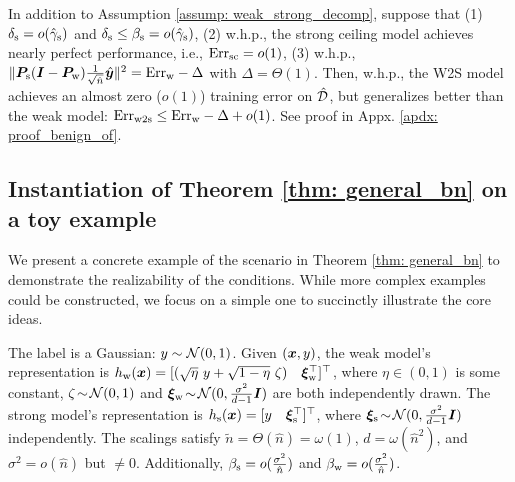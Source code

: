 \begin{theorem}\label{thm: general_bn}
In addition to Assumption \ref{assump: weak_strong_decomp}, suppose that
(1) $\delta_{\text{s}} = o(\hat{\gamma}_{\text{s}})$ and $\delta_{\text{s}} \leq \beta_{\text{s}} = o(\hat{\gamma}_{\text{s}})$, (2) w.h.p.,  the strong ceiling model achieves nearly perfect performance, i.e., $\text{Err}_{\text{sc}} = o(1)$, (3) w.h.p., $\| {\bm{P}}_{\text{s}} ({\bm{I}} -{\bm{P}}_{\text{w}} ) \frac{1}{\sqrt{\hat{n}}} \hat{{\bm{y}}}  \|^2  = \text{Err}_{\text{w}}-\Delta  $ with $\Delta=\Theta(1)$. Then, w.h.p., the W2S model achieves an almost zero ($o(1)$) training error on  $\hat{{\mathcal{D}}}$, but generalizes better than the weak model: $ 
  \text{Err}_{\text{w2s}} \leq \text{Err}_{\text{w}} - \Delta + o(1)$. See proof in Appx. \ref{apdx: proof_benign_of}. 
\end{theorem}

\subsection{Instantiation of Theorem \ref{thm: general_bn} on a toy example}

We present a concrete example of the scenario in Theorem \ref{thm: general_bn} to demonstrate the realizability of the conditions. 
While more complex examples could be constructed, we focus on a simple one to succinctly illustrate the core ideas.


\begin{example}\label{eg: toyeg} The label is a Gaussian: $y\sim{\mathcal{N}}(0,1)$. Given $({\bm{x}}, y)$, the weak model's representation is
 $ h_{\text{w}}({\bm{x}}) = [( \sqrt{\eta} ~y+\sqrt{1-\eta} ~\zeta) ~~~ {\bm{\xi}}_{\text{w}}^\top]^\top$, where $\eta\in(0,1)$ is some constant, $\zeta\!\sim\!{\mathcal{N}}(0, 1)$ and ${\bm{\xi}}_{\text{w}}\!\sim\!{\mathcal{N}}(0, \frac{\sigma^2}{d-1}{\bm{I}} ) $ are both independently drawn. The strong model's representation is
 $ h_{\text{s}}({\bm{x}}) = [y ~~~ {\bm{\xi}}_{\text{s}}^\top]^\top $,
where ${\bm{\xi}}_{\text{s}}\!\sim\!{\mathcal{N}}(0, \frac{\sigma^2}{d-1}{\bm{I}} ) $ independently. The scalings satisfy $\tilde{n}=\Theta(\hat{n}) =\omega(1)$, $ d=\omega(\hat{n}^2) $, and $\sigma^2 = o(\hat{n})$ but $\neq 0$. Additionally, $\beta_{\text{s}} = o(\frac{\sigma^2}{\hat{n}})$ and $\beta_{\text{w}} = o(\frac{\sigma^2}{\hat{n}})$.
\end{example}

